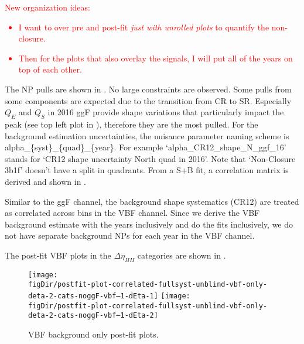 \textcolor{red}{
New organization ideas: 
\begin{itemize}
\item I want to over pre and post-fit \emph{just with unrolled plots} to quantify the non-closure.
\item Then for the plots that also overlay the signals, I will put all of the years on top of each other.
\end{itemize}
}

The NP pulls are shown in \Fig{\ref{fig:ggf-pulls-corr-bonly}}.
No large constraints are observed.
Some pulls from some components are expected due to the transition from CR to SR.
Especially $Q_E$ and $Q_S$ in 2016 ggF provide shape variations that particularly impact the \mhh peak (see top left plot in \Fig{\ref{fig:sr-np-impact-by-cat}}), therefore they are the most pulled.
For the background estimation uncertainties, the nuisance parameter naming scheme is alpha\_\{syst\}\_\{quad\}\_\{year\}.
For example `alpha\_CR12\_shape\_N\_ggf\_16' stands for `CR12 shape uncertainty North quad in 2016'.
Note that `Non-Closure 3b1f' doesn't have a split in quadrants.
From a S+B fit, a correlation matrix is derived and shown in \Fig{\ref{fig:ggf-correlation-matrix-corr-sm}}.


Similar to the ggF channel, the background shape systematics (CR12) are treated as correlated across \deta bins in the VBF channel.
Since we derive the VBF background estimate with the years inclusively and do the fits inclusively, we do not have separate background NPs for each year in the VBF channel.

The post-fit VBF plots in the $\Delta \eta_{HH}$ categories are shown in \Fig{\ref{fig:vbf-postfit}}.

\begin{figure}[htp]
\centering
	\texttt{[image: \\figDir/postfit-plot-correlated-fullsyst-unblind-vbf-only-deta-2-cats-noggF-vbf--1-dEta-1]} 
	\texttt{[image: \\figDir/postfit-plot-correlated-fullsyst-unblind-vbf-only-deta-2-cats-noggF-vbf--1-dEta-2]} 
	\caption{VBF background only post-fit plots.}
	\label{fig:vbf-postfit}
\end{figure}

